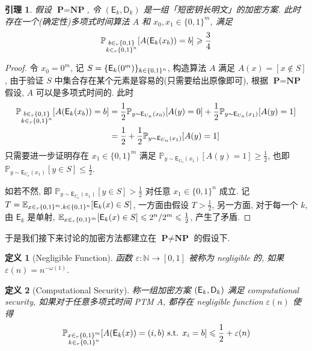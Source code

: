 \documentclass[8pt]{article}
\theoremstyle{compact}
\newtheorem{lemma}{引理}[section]
\newtheorem{definition}{定义}[section]
\def\le{\leqslant}
\def\ge{\geqslant}
\def\P{\textbf{P}}
\def\NP{\textbf{NP}}
\begin{document}
\begin{lemma}
	假设 $\P = \NP$, 令 $(\textsf{E}_k, \textsf{D}_k)$ 是一组「短密钥长明文」的加密方案. 此时存在一个(确定性)多项式时间算法 $A$ 和 $x_0, x_1 \in \{0, 1\}^m$, 满足 $$\mathbb P_{\substack{b \in_r \{0, 1\} \\ k \in_r \{0, 1\}^n}}[A(\textsf E_k(x_b)) = b] \ge \frac34$$
\end{lemma}
\begin{proof}
	令 $x_0 = 0^m$, 记 $S = \{\textsf E_k(0^m)\}_{k \in \{0, 1\}^n}$, 构造算法 $A$ 满足 $A(x) = [x \notin S]$, 由于验证 $S$ 中集合存在某个元素是容易的(只需要给出原像即可), 根据 $\P = \NP$ 假设, $A$ 可以是多项式时间的. 此时 \begin{align*}
		\begin{split}
			\mathbb P_{\substack{b \in_r \{0, 1\} \\ k \in_r \{0, 1\}^n}}[A(\textsf E_k(x_b)) = b] &= \frac12\mathbb P_{y \sim \textsf{E}_{U_n}(x_0)}[A(y) = 0] + \frac12\mathbb P_{y \sim \textsf{E}_{U_n}(x_1)}[A(y) = 1] \\&= \frac12 + \frac12\mathbb P_{y \sim \textsf{E}_{U_n}(x_1)}[A(y) = 1]
		\end{split}
	\end{align*}
	只需要进一步证明存在 $x_1 \in \{0, 1\}^m$ 满足 $\mathbb P_{y \sim \textsf{E}_{U_n}(x_1)}[A(y) = 1] \ge \frac12$, 也即 $\mathbb P_{y \sim \textsf{E}_{U_n}(x_1)}[y \in S] \le \frac12$.

	如若不然, 即 $\mathbb P_{y \sim \textsf{E}_{U_n}(x_1)}[y \in S] > \frac12$ 对任意 $x_1 \in \{0, 1\}^n$ 成立. 记 $T = \mathbb E_{x \in_r \{0, 1\}^m, k \in \{0, 1\}^n}[\textsf E_k(x) \in S]$, 一方面由假设 $T > \frac12$, 另一方面, 对于每一个 $k$, 由 $\textsf{E}_k$ 是单射, $\mathbb E_{x \in_r \{0, 1\}^m}[\textsf E_k(x) \in S] \le 2^n/2^m \le \frac12$, 产生了矛盾.
\end{proof}

于是我们接下来讨论的加密方法都建立在 $\P \neq \NP$ 的假设下.

\begin{definition}[Negligible Function]
	函数 $\varepsilon: \mathbb N \to [0, 1]$ 被称为 negligible 的, 如果 $\varepsilon(n) = n^{-\omega(1)}$.
\end{definition}

\begin{definition}[Computational Security]
	称一组加密方案 $(\textsf E_k, \textsf D_k)$ 满足 computational security, 如果对于任意多项式时间 PTM $A$, 都存在 negligible function $\varepsilon(n)$ 使得 $$\mathbb P_{\substack{x \in_r \{0,1\}^m \\ k \in_r \{0, 1\}^n}}[A(\textsf E_k(x)) = (i, b) \text{ s.t. } x_i = b] \le \frac12 + \varepsilon(n)$$
\end{definition}
\end{document}
